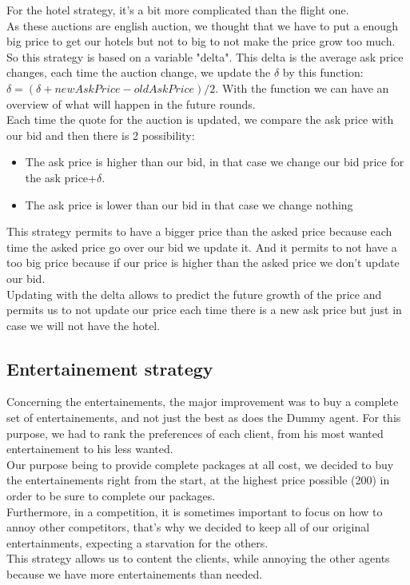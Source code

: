 For the hotel strategy, it's a bit more complicated than the flight one.\\
As these auctions are english auction, we thought that we have to put a enough big price to get our hotels but not to big to not make the price grow too much.\\
So this strategy is based on a variable "delta". This delta is the average ask price changes, each time the auction change, we update the $\delta$ by this function: $\delta = (\delta + newAskPrice - oldAskPrice)/2$. With the function we can have an overview of what will happen in the future rounds.\\
Each time the quote for the auction is updated, we compare the ask price with our bid and then there is 2 possibility:\\
\begin{itemize}
\item The ask price is higher than our bid, in that case we change our bid price for the ask price+$\delta$.
\item The ask price is lower than our bid in that case we change nothing
\end{itemize}
This strategy permits to have a bigger price than the asked price because each time the asked price go over our bid we update it. And it permits to not have a too big price because if our price is higher than the asked price we don't update our bid.\\
Updating with the delta allows to predict the future growth of the price and permits us to not update our price each time there is a new ask price but just in case we will not have the hotel.

\subsection{Entertainement strategy}

Concerning the entertainements, the major improvement was to buy a complete set of entertainements, and not just the best as does the Dummy agent.
For this purpose, we had to rank the preferences of each client, from his most wanted entertainement to his less wanted.\\
Our purpose being to provide complete packages at all cost, we decided to buy the entertainements right from the start, at the highest price possible (200) in order to be sure to complete our packages.\\
Furthermore, in a competition, it is sometimes important to focus on how to annoy other competitors, that's why we decided to keep all of our original entertainments, expecting a starvation for the others.\\
This strategy allows us to content the clients, while annoying the other agents because we have more entertainements than needed.

